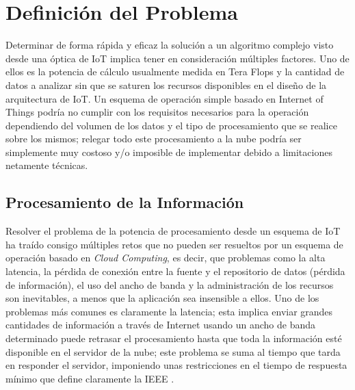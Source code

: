 
\chapter{Definición del Problema} %
\label{Chapter2}


Determinar de forma rápida y eficaz la solución a un algoritmo complejo visto desde una óptica de IoT implica tener en consideración múltiples factores. Uno de ellos es la potencia de cálculo usualmente medida en Tera Flops y la cantidad de datos a analizar sin que se saturen los recursos disponibles en el diseño de la arquitectura de IoT. Un esquema de operación simple basado en Internet of Things podría no cumplir con los requisitos necesarios para la operación dependiendo del volumen de los datos y el tipo de procesamiento que se realice sobre los mismos; relegar todo este procesamiento a la nube podría ser simplemente muy costoso y/o imposible de implementar debido a limitaciones netamente técnicas.



\section{Procesamiento de la Información}

Resolver el problema de la potencia de procesamiento desde un esquema de IoT ha traído consigo múltiples retos que no pueden ser resueltos por un esquema de operación basado en \textit{Cloud Computing}, es decir, que problemas como la alta latencia, la pérdida de conexión entre la fuente y el repositorio de datos (pérdida de información), el uso del ancho de banda y la administración de los recursos son inevitables, a menos que la aplicación sea insensible a ellos. Uno de los problemas más comunes es claramente la latencia; esta implica enviar grandes cantidades de información a través de Internet usando un ancho de banda determinado puede retrasar el procesamiento hasta que toda la información esté disponible en el servidor de la nube; este problema se suma al tiempo que tarda en responder el servidor, imponiendo unas restricciones en el tiempo de respuesta mínimo que define claramente la IEEE \citep{RTSSystems,FogBonomi}.

